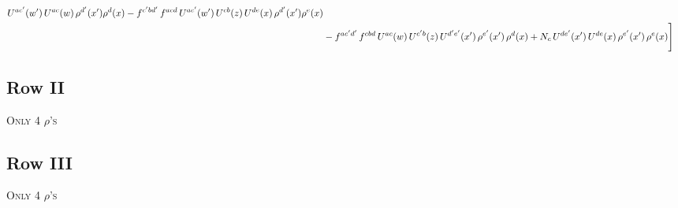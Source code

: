 \documentclass[9pt]{article}
\numberwithin{equation}{section}
\begin{document}
\begin{align}
U^{ac'}(w')\,U^{ac}(w)\,\rho^{d'}(x')\rho^{d}(x)- f^{c'bd'}\,f^{acd}\,U^{ac'}(w')\,U^{cb}(z)\,U^{de}(x)\,\rho^{d'}(x')\rho^{e}(x) \notag \\ & -f^{ac'd'}\,f^{cbd}\,U^{ac}(w)\,U^{c'b}(z)\,U^{d'e'}(x')\,\rho^{e'}(x')\,\rho^{d}(x) +N_{c}\,U^{de'}(x')\,U^{de}(x)\,\rho^{e'}(x')\,\rho^{e}(x)\Bigg]
\end{align}
\subsection{Row II\,}
\textsc{Only 4 $\rho$'s}
\subsection{Row III\,}
\textsc{Only 4 $\rho$'s}
\end{document}
